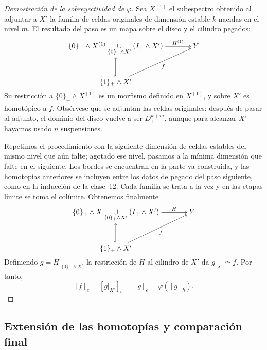 \begin{proof}[Demostración de la sobreyectividad de $\varphi$]
Sea $X^{(1)}$ el subespectro obtenido al adjuntar a $X'$ la familia de celdas originales de dimensión estable $k$ nacidas en el nivel $m$. El resultado del paso es un mapa sobre el disco y el cilindro pegados:
\[
\begin{tikzcd}[cramped,column sep=large,row sep=large]
\{0\}_+\wedge X^{(1)}
\underset{\{0\}_+\wedge X'}{\cup}(I_+\wedge X')
\arrow[r,"H^{(1)}"] & Y\\
\{1\}_+\wedge X' \arrow[u,hook] \arrow[ur,"f"'] &
\end{tikzcd}
\]
Su restricción a $\{0\}_+\wedge X^{(1)}$ es un morfismo definido en $X^{(1)}$, y sobre $X'$ es homotópico a $f$. Obsérvese que se adjuntan las celdas originales: después de pasar al adjunto, el dominio del disco vuelve a ser $D^{k+m}_+$, aunque para alcanzar $X'$ hayamos usado $n$ suspensiones.

Repetimos el procedimiento con la siguiente dimensión de celdas estables del mismo nivel que aún falte; agotado ese nivel, pasamos a la mínima dimensión que falte en el siguiente. Los bordes se encuentran en la parte ya construida, y las homotopías anteriores se incluyen entre los datos de pegado del paso siguiente, como en la inducción de la clase~12. Cada familia se trata a la vez y en las etapas límite se toma el colímite. Obtenemos finalmente
\[
\begin{tikzcd}[cramped,column sep=large,row sep=large]
\{0\}_+\wedge X
\underset{\{0\}_+\wedge X'}{\cup}(I_+\wedge X')
\arrow[r,"H"] & Y\\
\{1\}_+\wedge X' \arrow[u,hook] \arrow[ur,"f"'] &
\end{tikzcd}
\]
Definiendo $g=H|_{\{0\}_+\wedge X}$, la restricción de $H$ al cilindro de $X'$ da $g|_{X'}\simeq f$. Por tanto,
\[
[f]_e=[g|_{X'}]_e=[g]_e=\varphi([g]_h).
\]
\end{proof}

\subsection{Extensión de las homotopías y comparación final}

